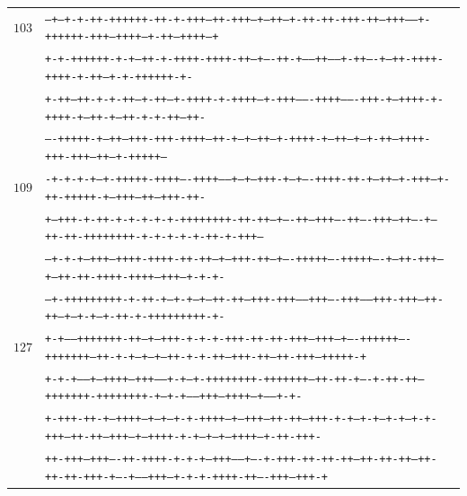 \documentclass[10pt]{article}
\begin{document}
\begin{center}
\begin{tabular}{rl}
\hline
$103$&\texttt{--+--+-+-++-++++++-++-+-+++--++-+++--+---++--+-++-++-+++-++--+++-----+-++++++-+++--++++---+-++--++++--+}\\
&\texttt{+-+-++++++-+-+---++-+-++++-++++-++--+----++-+------++------+-++----+--++-++++-++++-+-++---+-+-++++++-+-}\\
&\texttt{+-++--++-+-+-++--+-++--+-++++-+-++++--+-+++-------++++-------+++-+--++++-+-++++-+--++-+--++-+-+-++--++-}\\
&\texttt{----+++++-+--++---+++-+++-++++---++-+---+---++--+-++++-+--++---+---+-++---++++-+++-+++---++--+-+++++---}\\
\hline
$109$&\texttt{-+-+-+-+--+-+++++-++++----++++------+---+--+++-+--+----++++-++-+--++--+-+++--+-++-+++++-+---+++--++---+++-++-}\\
&\texttt{+--+++-+-++-+-+-+-+-+-++++++++-++-++--+----++--+++----++----+++--++----+--++-++-++++++++-+-+-+-+-+-++-+-+++--}\\
&\texttt{--+-+-+--+++--++++-++++-++-++--+--+++-++---+----+++++----+++++----+---++-+++--+--++-++-++++-++++--+++--+-+-+-}\\
&\texttt{--+-+++++++++-+-++-+--+-+--+--++-++--+++-+++------+++----+++------+++-+++--++-++--+--+-+--+-++-+-+++++++++-+-}\\
\hline
$127$&\texttt{+-+-----+++++++-++--+---+++-+-+-+-+++-++-++-+++--+++--+----++++++----+++++++---++-+-+--+--+--++-+-+-++--+++-++--++-+++--+++++-+}\\
&\texttt{+-+-+------+---++++--+++-----+-+--+-++++++++-+++++++---++-++-+----+-++-++---+++++++-++++++++-+--+-+-----+++--++++---+------+-+-}\\
&\texttt{+-+++-++-+--++++--+--+--+-+-++++---+--+++--++-++---+++-+-+--+-+--+-+--+-+-+++---++-++--+++--+---++++-+-+--+--+--++++--+-++-+++-}\\
&\texttt{++-+++--+++----++-++++-+-+-+---+++-----+----+-+++-++-++-++--++-++-++--++-++-++-+++-+----+-----+++---+-+-+-++++-++----+++--+++-+}\\
\hline
\end{tabular}
\end{center}
\end{document}
